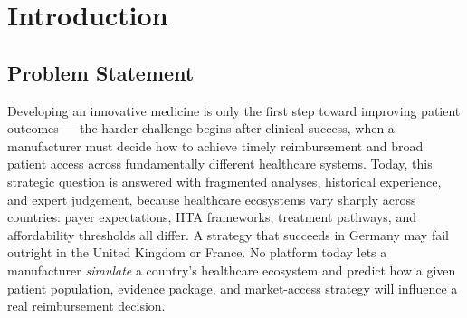 \documentclass[11pt,a4paper]{article}
\begin{document}
\begin{abstract}
\noindent
Manufacturers spend weeks of fragmented, manual health-economics analysis trying to anticipate how
divergent European Health Technology Assessment (HTA) bodies will respond to a new therapy.
\textbf{PayerLens AI} is an audit-ready web platform that simulates and predicts reimbursement
access probability for a heart-failure therapy across the United Kingdom (NICE), Germany
(G-BA/IQWiG), and France (HAS) --- combining a transparent, citation-backed multi-attribute
decision simulation with a calibrated machine-learning ensemble trained on 1,452 real and curated
historical HTA appraisal records. The platform lets a cross-functional team test price points,
companion-diagnostic requirements, and patient-population strategy against five real historical
drug precedents (Farxiga, Verquvo, Entresto, Jardiance, and a broad-class archetype), returning
country-specific access probabilities, budget-impact alerts, and a strategic launch-sequence
recommendation in real time. This report documents the problem motivating the platform, its
dual-engine system architecture, the data and modelling methodology (including a data-leakage
issue discovered and corrected during development), implementation and deployment details,
evaluation results, known limitations, and a roadmap toward production readiness.
\end{abstract}

\clearpage
\tableofcontents
\thispagestyle{fancy}
\newpage

\section{Introduction}

\subsection{Problem Statement}
Developing an innovative medicine is only the first step toward improving patient outcomes ---
the harder challenge begins after clinical success, when a manufacturer must decide how to achieve
timely reimbursement and broad patient access across fundamentally different healthcare systems.
Today, this strategic question is answered with fragmented analyses, historical experience, and
expert judgement, because healthcare ecosystems vary sharply across countries: payer expectations,
HTA frameworks, treatment pathways, and affordability thresholds all differ. A strategy that
succeeds in Germany may fail outright in the United Kingdom or France. No platform today lets a
manufacturer \emph{simulate} a country's healthcare ecosystem and predict how a given patient
population, evidence package, and market-access strategy will influence a real reimbursement
decision.
\end{document}
